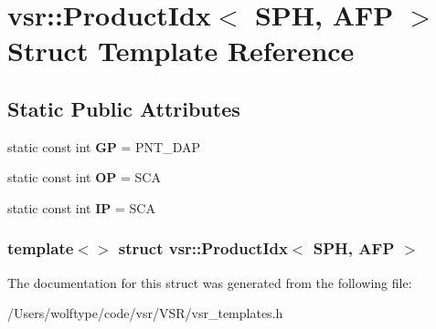 \hypertarget{structvsr_1_1_product_idx_3_01_s_p_h_00_01_a_f_p_01_4}{\section{vsr\-:\-:Product\-Idx$<$ S\-P\-H, A\-F\-P $>$ Struct Template Reference}
\label{structvsr_1_1_product_idx_3_01_s_p_h_00_01_a_f_p_01_4}
}
\subsection*{Static Public Attributes}
\begin{DoxyCompactItemize}
\item 
\hypertarget{structvsr_1_1_product_idx_3_01_s_p_h_00_01_a_f_p_01_4_ae32b4486801f724759751b6aa5927605}{static const int {\bfseries G\-P} = P\-N\-T\-\_\-\-D\-A\-P}\label{structvsr_1_1_product_idx_3_01_s_p_h_00_01_a_f_p_01_4_ae32b4486801f724759751b6aa5927605}

\item 
\hypertarget{structvsr_1_1_product_idx_3_01_s_p_h_00_01_a_f_p_01_4_a78afd486a20818bfc4d6b1a7b45151b9}{static const int {\bfseries O\-P} = S\-C\-A}\label{structvsr_1_1_product_idx_3_01_s_p_h_00_01_a_f_p_01_4_a78afd486a20818bfc4d6b1a7b45151b9}

\item 
\hypertarget{structvsr_1_1_product_idx_3_01_s_p_h_00_01_a_f_p_01_4_a02cc9a6fe2d93e3028c5b3e6802202cb}{static const int {\bfseries I\-P} = S\-C\-A}\label{structvsr_1_1_product_idx_3_01_s_p_h_00_01_a_f_p_01_4_a02cc9a6fe2d93e3028c5b3e6802202cb}

\end{DoxyCompactItemize}
\subsubsection*{template$<$$>$ struct vsr\-::\-Product\-Idx$<$ S\-P\-H, A\-F\-P $>$}



The documentation for this struct was generated from the following file\-:\begin{DoxyCompactItemize}
\item 
/\-Users/wolftype/code/vsr/\-V\-S\-R/vsr\-\_\-templates.\-h\end{DoxyCompactItemize}
